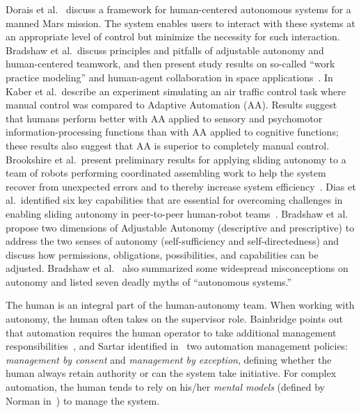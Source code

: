 \documentclass[lettersize, apacite, twoside, HRI]{apa_HRI}
\begin{document}
Dorais et al.\ \cite{Dorais1998AdjustableAutonomy} discuss a framework for human-centered autonomous systems for a manned Mars mission. The system enables users to interact with these systems at an appropriate level of control but minimize the necessity for such interaction. Bradshaw et al.\ discuss principles and pitfalls of adjustable autonomy and human-centered teamwork, and then present study results on so-called ``work practice modeling'' and human-agent collaboration in space applications~\cite{Bradshaw2003AdjustableAutonomy}. In~\cite{Kaber2005Adaptive} Kaber et al.\ describe an experiment simulating an air traffic control task where manual control was compared to Adaptive Automation (AA). Results suggest that humans perform better with AA applied to sensory and psychomotor information-processing functions than with AA applied to cognitive functions; these results also suggest that AA is superior to completely manual control. Brookshire et al.\ present preliminary results for applying sliding autonomy to a team of robots performing coordinated assembling work to help the system recover from unexpected errors and to thereby increase system efficiency~\cite{Brookshire2004Preliminary}. Dias et al.\ identified six key capabilities that are essential for overcoming challenges in enabling sliding autonomy in peer-to-peer human-robot teams~\cite{Dias2008SlidingAutonomy}. Bradshaw et al.\ \cite{Bradshaw2004Dimensions} propose two dimensions of Adjustable Autonomy (descriptive and prescriptive) to address the two senses of autonomy (self-sufficiency and self-directedness) and discuss how permissions, obligations, possibilities, and capabilities can be adjusted. Bradshaw et al.\ \cite{Bradshaw2013Seven} also summarized some widespread misconceptions on autonomy and listed seven deadly myths of ``autonomous systems.''

The human is an integral part of the human-autonomy team. When working with autonomy, the human often takes on the supervisor role. Bainbridge points out that automation requires the human operator to take additional management responsibilities~\cite{Bainbridge1983Ironies}, and Sartar identified in~\cite{Sarter1998Making} two automation management policies: \textit{management by consent} and \textit{management by exception}, defining whether the human always retain authority or can the system take initiative. For complex automation, the human tends to rely on his/her \textit{mental models} (defined by Norman in~\cite{Norman1983Some}) to manage the system. 
\end{document}
